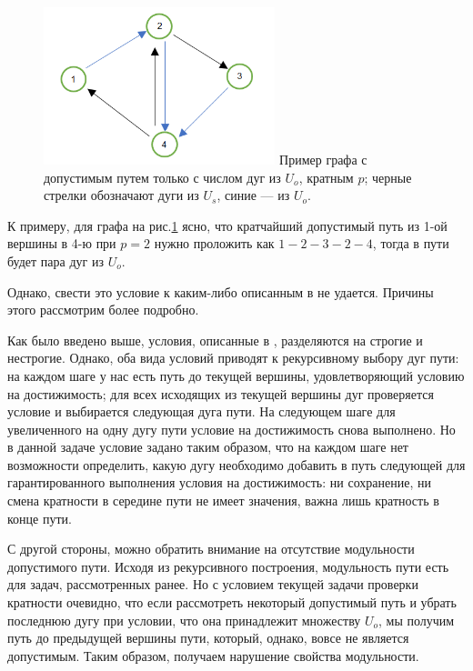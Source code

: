 \begin{figure}
	\centering
	{\includegraphics[width=0.6\textwidth]{img/22.png}}
	{Пример графа с допустимым путем только с числом дуг из $U_o$, кратным $p$; черные стрелки обозначают дуги из $U_s$, синие --- из $U_o$.}
	\label{fig:pic_2}
\end{figure}

К примеру, для графа на рис.\ref{fig:pic_2} ясно, что кратчайший допустимый путь из 1-ой вершины в 4-ю при $p = 2$ нужно проложить как $1-2-3-2-4$, тогда в пути будет пара дуг из $U_o$.

Однако, свести это условие к каким-либо описанным в \cite{Mono} не удается. Причины этого рассмотрим более подробно.

Как было введено выше, условия, описанные в \cite{Mono}, разделяются на строгие и нестрогие. Однако, оба вида условий приводят к рекурсивному выбору дуг пути: на каждом шаге у нас есть путь до текущей вершины, удовлетворяющий условию на достижимость; для всех исходящих из текущей вершины дуг проверяется условие и выбирается следующая дуга пути. На следующем шаге для увеличенного на одну дугу пути условие на достижимость снова выполнено. Но в данной задаче условие задано таким образом, что на каждом шаге нет возможности определить, какую дугу необходимо добавить в путь следующей для гарантированного выполнения условия на достижимость: ни сохранение, ни смена кратности в середине пути не имеет значения, важна лишь кратность в конце пути. 

С другой стороны, можно обратить внимание на отсутствие модульности допустимого пути. Исходя из рекурсивного построения, модульность пути есть для задач, рассмотренных ранее. Но с условием текущей задачи проверки кратности очевидно, что если рассмотреть некоторый допустимый путь и убрать последнюю дугу при условии, что она принадлежит множеству $U_o$, мы получим путь до предыдущей вершины пути, который, однако, вовсе не является допустимым. Таким образом, получаем нарушение свойства модульности. 

